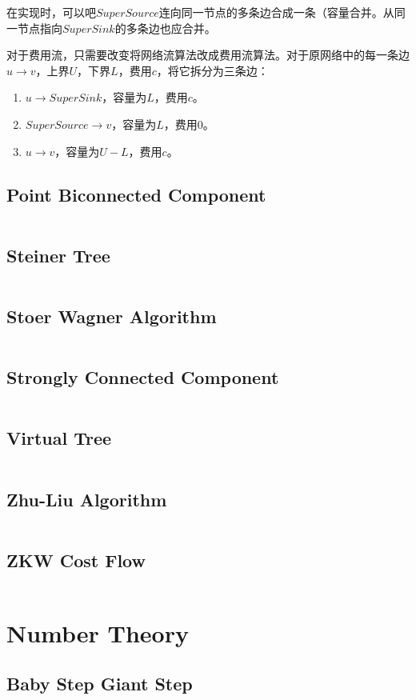 \documentclass[a4paper,openany]{book}
\newcommand{\cppcode}[1]
{
  \inputminted[mathescape,
  tabsize=4,
  linenos,
  framesep=2mm,
  breakaftergroup=true,
  breakautoindent=true,
  breakbytoken=true,
  breaklines=true,
  fontsize=\small
  ]{cpp}{Source/#1}
}
\begin{document}
在实现时，可以吧$SuperSource$连向同一节点的多条边合成一条（容量合并。从同一节点指向$SuperSink$的多条边也应合并。

对于费用流，只需要改变将网络流算法改成费用流算法。对于原网络中的每一条边$u \rightarrow v$，上界$U$，下界$L$，费用$c$，将它拆分为三条边：
\begin{enumerate}[(1)]
\item $u \rightarrow SuperSink$，容量为$L$，费用$c$。
\item $SuperSource \rightarrow v$，容量为$L$，费用$0$。
\item $u \rightarrow v$，容量为$U-L$，费用$c$。
\end{enumerate}
\section{Point Biconnected Component}
\cppcode{/Graph Theory/Point Biconnected Component.cpp}
\section{Steiner Tree}
\cppcode{/Graph Theory/Steiner Tree.cpp}
\section{Stoer Wagner Algorithm}
\cppcode{/Graph Theory/Stoer Wagner Algorithm.cpp}
\section{Strongly Connected Component}
\cppcode{/Graph Theory/Strongly Connected Component.cpp}
\section{Virtual Tree}
\cppcode{/Graph Theory/Virtual Tree.cpp}
\section{Zhu-Liu Algorithm}
\cppcode{/Graph Theory/Zhu-Liu Algorithm.cpp}
\section{ZKW Cost Flow}
\cppcode{/Graph Theory/ZKW Cost Flow.cpp}

\chapter{Number Theory}
\section{Baby Step Giant Step}
\cppcode{/Number Theory/Baby Step Giant Step.cpp}
\end{document}
